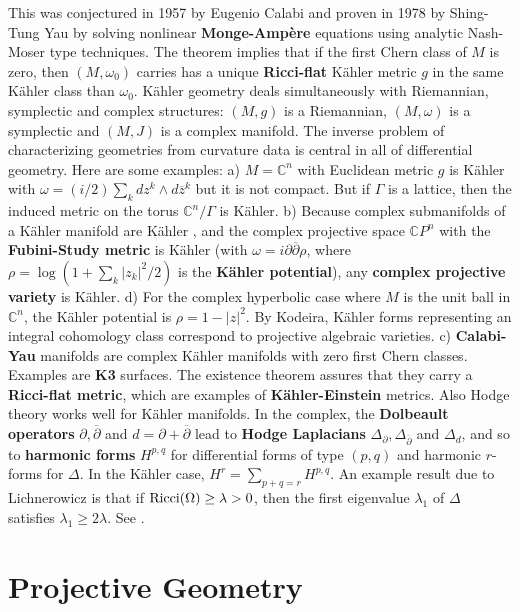 \documentclass[12pt]{amsart}
\newcounter{example}    \def\example#1{ \item \fontsize{12}{15} \selectfont #1 \fontsize{12}{15} \selectfont }
\begin{document}
This was conjectured in 1957 by Eugenio Calabi and proven in 1978 by 
Shing-Tung Yau by solving nonlinear {\bf Monge-Amp\`ere} equations using
analytic Nash-Moser type techniques. 
The theorem implies that if the first Chern class of $M$ is zero, 
then $(M,\omega_0)$ carries has a unique {\bf Ricci-flat} K\"ahler 
metric $g$ in the same K\"ahler class than $\omega_0$. 
K\"ahler geometry deals simultaneously
with Riemannian, symplectic and complex structures: $(M,g)$ is a Riemannian,
$(M,\omega)$ is a symplectic and $(M,J)$ is a complex manifold. 
The inverse problem of characterizing geometries from curvature 
data is central in all of differential geometry. Here are some examples:
a) $M=\mathbb{C}^n$ with Euclidean metric $g$ is K\"ahler with 
$\omega=(i/2) \sum_k dz^k \wedge d\overline{z}^k$
but it is not compact. 
But if $\Gamma$ is a lattice, then the induced metric on the torus 
$\mathbb{C}^n/\Gamma$ is K\"ahler. 
b) Because complex submanifolds of a K\"ahler manifold are K\"ahler ,
and the complex projective space $\mathbb{C}P^n$ with the 
{\bf Fubini-Study metric} is K\"ahler 
(with $\omega=i \partial \overline{\partial} \rho$, where
$\rho=\log(1+\sum_k |z_k|^2/2)$ is the {\bf K\"ahler potential}), 
any {\bf complex projective variety} is K\"ahler. 
d) For the complex hyperbolic case where $M$ is the unit ball in 
$\mathbb{C}^n$, the K\"ahler potential is $\rho=1-|z|^2$. 
By Kodeira, K\"ahler forms representing an integral cohomology class
correspond to projective algebraic varieties. 
c) {\bf Calabi-Yau} manifolds are complex K\"ahler manifolds with 
zero first Chern classes. Examples are {\bf K3} surfaces. 
The existence theorem assures that they carry a 
{\bf Ricci-flat metric}, which are examples of {\bf K\"ahler-Einstein} metrics. 
Also Hodge theory works well for K\"ahler manifolds. In the complex, the 
{\bf Dolbeault operators} $\partial, \overline{\partial}$ and $d=\partial+\overline{\partial}$ 
lead to {\bf Hodge Laplacians} $\Delta_\partial, \Delta_{\overline{\partial}}$ and $\Delta_d$,
and so to {\bf harmonic forms} $H^{p,q}$ for differential forms of type $(p,q)$ and harmonic 
$r$-forms for $\Delta$. In the K\"ahler case, 
$H^r = \sum_{p+q=r} H^{p,q}$. An example result due to Lichnerowicz is that if 
${\rm Ricci}(\Omega) \geq \lambda>0$, then the first eigenvalue 
$\lambda_1$ of $\Delta$ satisfies $\lambda_1 \geq 2 \lambda$.  
See \cite{BallmanLectures,Westrich,AubinNonlinear}.

\section{Projective Geometry}
\end{document}
